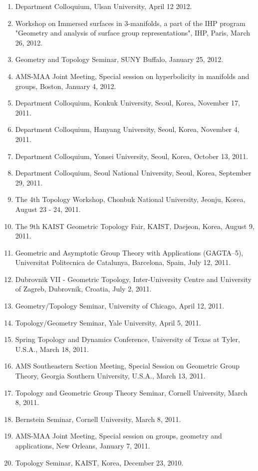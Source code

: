 \documentclass[11pt,a4paper]{article}
\begin{document}
\begin{enumerate}[leftmargin=1.5em, label=\arabic*.]
\item Department Colloquium, Ulsan University, April 12 2012.
\item Workshop on Immersed surfaces in 3-manifolds, a part of the IHP program "Geometry and analysis of surface group representations", IHP, Paris, March 26, 2012.
\item Geometry and Topology Seminar, SUNY Buffalo, January 25, 2012.
\item AMS-MAA Joint Meeting, Special session on hyperbolicity in manifolds and groups, Boston, January 4, 2012.
\item Department Colloquium, Konkuk University, Seoul, Korea, November 17, 2011.
\item Department Colloquium, Hanyang University, Seoul, Korea, November 4, 2011.
\item Department Colloquium, Yonsei University, Seoul, Korea, October 13, 2011.
\item Department Colloquium, Seoul National University, Seoul, Korea, September 29, 2011.
\item The 4th Topology Workshop, Chonbuk National University, Jeonju, Korea, August 23 - 24, 2011.
\item The 9th KAIST Geometric Topology Fair, KAIST, Daejeon, Korea, August 9, 2011.
\item Geometric and Asymptotic Group Theory with Applications (GAGTA--5), Universitat Politecnica de Catalunya, Barcelona, Spain, July 12, 2011.
\item Dubrovnik VII - Geometric Topology, Inter-University Centre and University of Zagreb, Dubrovnik, Croatia, July 2, 2011.
\item Geometry/Topology Seminar, University of Chicago, April 12, 2011.
\item Topology/Geometry Seminar, Yale University, April 5, 2011.
\item Spring Topology and Dynamics Conference, University of Texas at Tyler, U.S.A., March 18, 2011.
\item AMS Southeastern Section Meeting, Special Session on Geometric Group Theory, Georgia Southern University, U.S.A., March 13, 2011.
\item Topology and Geometric Group Theory Seminar, Cornell University, March 8, 2011.
\item Bernstein Seminar, Cornell University, March 8, 2011.
\item AMS-MAA Joint Meeting, Special session on groups, geometry and applications, New Orleans, January 7, 2011.
\item Topology Seminar, KAIST, Korea, December 23, 2010.

\end{enumerate}
\end{document}
